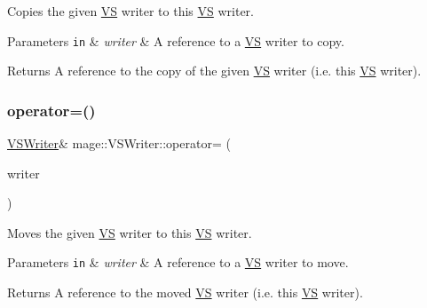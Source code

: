 Copies the given \hyperlink{structmage_1_1_v_s}{VS} writer to this \hyperlink{structmage_1_1_v_s}{VS} writer.


\begin{DoxyParams}[1]{Parameters}
\mbox{\tt in}  & {\em writer} & A reference to a \hyperlink{structmage_1_1_v_s}{VS} writer to copy. \\
\hline
\end{DoxyParams}
\begin{DoxyReturn}{Returns}
A reference to the copy of the given \hyperlink{structmage_1_1_v_s}{VS} writer (i.\+e. this \hyperlink{structmage_1_1_v_s}{VS} writer). 
\end{DoxyReturn}
\hypertarget{classmage_1_1_v_s_writer_af1dca5c791cfb62967cd2437f7db170a}{}\label{classmage_1_1_v_s_writer_af1dca5c791cfb62967cd2437f7db170a} 
\subsubsection{\texorpdfstring{operator=()}{operator=()}\hspace{0.1cm}{\footnotesize\ttfamily [2/2]}}
{\footnotesize\ttfamily \hyperlink{classmage_1_1_v_s_writer}{V\+S\+Writer}\& mage\+::\+V\+S\+Writer\+::operator= (\begin{DoxyParamCaption}\item[{\hyperlink{classmage_1_1_v_s_writer}{V\+S\+Writer} \&\&}]{writer }\end{DoxyParamCaption})\hspace{0.3cm}{\ttfamily [delete]}}

Moves the given \hyperlink{structmage_1_1_v_s}{VS} writer to this \hyperlink{structmage_1_1_v_s}{VS} writer.


\begin{DoxyParams}[1]{Parameters}
\mbox{\tt in}  & {\em writer} & A reference to a \hyperlink{structmage_1_1_v_s}{VS} writer to move. \\
\hline
\end{DoxyParams}
\begin{DoxyReturn}{Returns}
A reference to the moved \hyperlink{structmage_1_1_v_s}{VS} writer (i.\+e. this \hyperlink{structmage_1_1_v_s}{VS} writer). 
\end{DoxyReturn}
\hypertarget{classmage_1_1_v_s_writer_a417c8bcf7ab26e88b253e9ffbdb60192}{}\label{classmage_1_1_v_s_writer_a417c8bcf7ab26e88b253e9ffbdb60192} 
